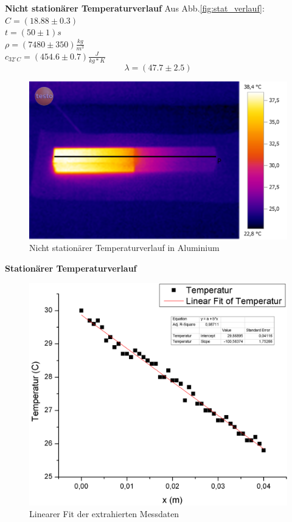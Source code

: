 \documentclass[12pt,a4paper]{article}
\begin{document}
\begin{multicols}{2}

\noindent \textbf{Nicht stationärer Temperaturverlauf}
\noindent Aus Abb.\ref{fig:stat_verlauf}:\\
$C=(18.88\pm 0.3)$\\
$t=(50 \pm 1) s$\\
$\rho = (7480 \pm 350)\frac{kg}{m^3}$\\ 
$c_{32^{\circ}C} = (454.6 \pm 0.7)\frac{J}{kg * K}$\\
$$\lambda = (47.7 \pm 2.5)$$


\begin{figure}[H]
	\centering
	\includegraphics[scale=0.12]{./BilderCorrect/Versuch_1_gradient_60.png}
	\caption{Nicht stationärer Temperaturverlauf in Aluminium }
	\label{fig:nicht_stat_waermebild}
\end{figure}





\noindent \textbf{Stationärer Temperaturverlauf}

\begin{figure}[H]
	\centering
	\includegraphics[scale=0.25]{./BilderCorrect/Versuch_1_stationaer_Graph.png}
	\caption{Linearer Fit der extrahierten Messdaten}
	\label{fig:stat_fit}
\end{figure}



\end{multicols}
\end{document}
